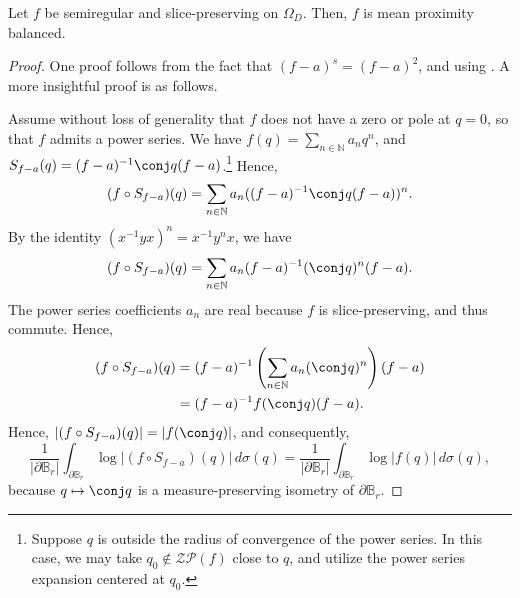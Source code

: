 \documentclass{amsart}
\begin{document}
\begin{prop}
    Let $f$ be semiregular and slice-preserving on $\Omega_D$. Then, $f$ is mean proximity balanced. 
\end{prop}
\begin{proof}
    One proof follows from the fact that $(f-a)^s=(f-a)^2$, and using \cite[Proposition 8]{perottiJensen2019}. A more insightful proof is as follows. 

    Assume without loss of generality that $f$ does not have a zero or pole at $q=0$, so that $f$ admits a power series. We have $f(q)=\sum_{n\in\mathbb N}a_nq^n$, and $S_{f-a}(q)=(f-a)^{-1}\conj q (f-a)$.\footnote{Suppose $q$ is outside the radius of convergence of the power series. In this case, we may take $q_0\not\in\mathcal{ZP}(f)$ close to $q$, and utilize the power series expansion centered at $q_0$.} Hence, \[(f\circ S_{f-a})(q)=\sum_{n\in \mathbb N}a_n ((f-a)^{-1}\conj q (f-a))^n.\] By the identity $(x^{-1}yx)^n=x^{-1}y^nx$, we have \[(f\circ S_{f-a})(q)=\sum_{n\in \mathbb N}a_n (f-a)^{-1}(\conj q)^n (f-a).\] The power series coefficients $a_n$ are real because $f$ is slice-preserving, and thus commute. Hence, \begin{align}
        (f\circ S_{f-a})(q)&=(f-a)^{-1}\left(\sum_{n\in\mathbb N}a_n (\conj q)^n\right) (f-a) \\
        &= (f-a)^{-1}f(\conj q)(f-a).
    \end{align}
    Hence, $|(f\circ S_{f-a})(q)|=|f(\conj q)|$, and consequently, \[\frac{1}{|\partial \mathbb B_r|}\int_{\partial \mathbb B_r}\log|(f\circ S_{f-a})(q)|\,d\sigma (q)=\frac{1}{|\partial \mathbb B_r|}\int_{\partial \mathbb B_r}\log|f(q)|\,d\sigma (q),\] because $q \mapsto\conj q$ is a measure-preserving isometry of $\partial\mathbb B_r$. 
\end{proof}
\end{document}
